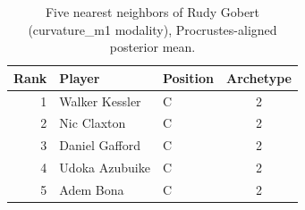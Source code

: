 \begin{table}[htbp]
  \centering\small
  \begin{tabular}{rllc}
    \toprule
    Rank & Player & Position & Archetype \\
    \midrule
    1 & Walker Kessler & C & 2 \\
    2 & Nic Claxton & C & 2 \\
    3 & Daniel Gafford & C & 2 \\
    4 & Udoka Azubuike & C & 2 \\
    5 & Adem Bona & C & 2 \\
    \bottomrule
  \end{tabular}
  \caption{Five nearest neighbors of Rudy Gobert (curvature_m1 modality), Procrustes-aligned posterior mean.}
  \label{tab:Rudy_Gobert_neighbors_curvature_m1}
\end{table}

